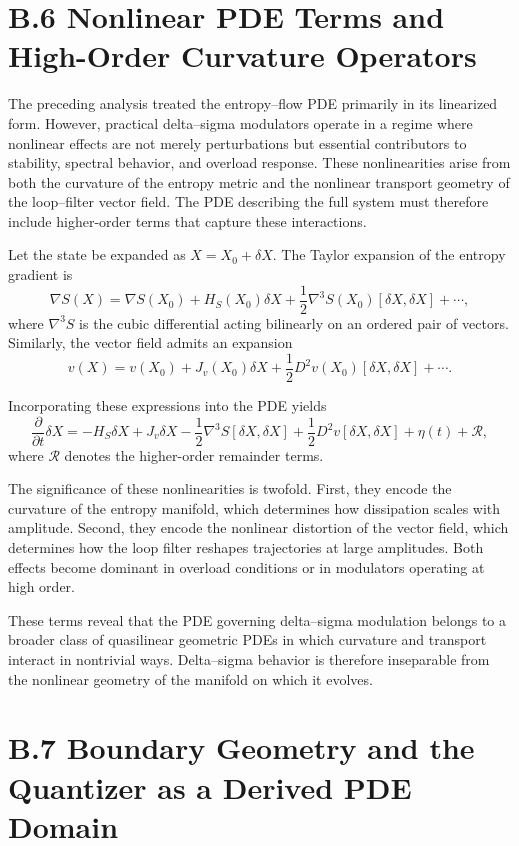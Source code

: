 \section{B.6 Nonlinear PDE Terms and High-Order Curvature Operators}

The preceding analysis treated the entropy–flow PDE primarily in its linearized form. However, practical delta–sigma modulators operate in a regime where nonlinear effects are not merely perturbations but essential contributors to stability, spectral behavior, and overload response. These nonlinearities arise from both the curvature of the entropy metric and the nonlinear transport geometry of the loop–filter vector field. The PDE describing the full system must therefore include higher-order terms that capture these interactions.

Let the state be expanded as \(X = X_{0} + \delta X\). The Taylor expansion of the entropy gradient is
\[
\nabla S(X) = \nabla S(X_{0}) + H_{S}(X_{0}) \delta X + \frac{1}{2}\nabla^{3}S(X_{0})[\delta X,\delta X] + \cdots,
\]
where \(\nabla^{3}S\) is the cubic differential acting bilinearly on an ordered pair of vectors. Similarly, the vector field admits an expansion
\[
v(X) = v(X_{0}) + J_{v}(X_{0})\delta X + \frac{1}{2}D^{2}v(X_{0})[\delta X,\delta X] + \cdots.
\]

Incorporating these expressions into the PDE yields
\[
\frac{\partial}{\partial t}\delta X 
= -H_{S}\delta X + J_{v}\delta X 
- \frac{1}{2}\nabla^{3}S[\delta X,\delta X]
+ \frac{1}{2}D^{2}v[\delta X,\delta X] 
+ \eta(t) + \mathcal{R},
\]
where \(\mathcal{R}\) denotes the higher-order remainder terms.

The significance of these nonlinearities is twofold. First, they encode the curvature of the entropy manifold, which determines how dissipation scales with amplitude. Second, they encode the nonlinear distortion of the vector field, which determines how the loop filter reshapes trajectories at large amplitudes. Both effects become dominant in overload conditions or in modulators operating at high order.

These terms reveal that the PDE governing delta–sigma modulation belongs to a broader class of quasilinear geometric PDEs in which curvature and transport interact in nontrivial ways. Delta–sigma behavior is therefore inseparable from the nonlinear geometry of the manifold on which it evolves.

\section{B.7 Boundary Geometry and the Quantizer as a Derived PDE Domain}

